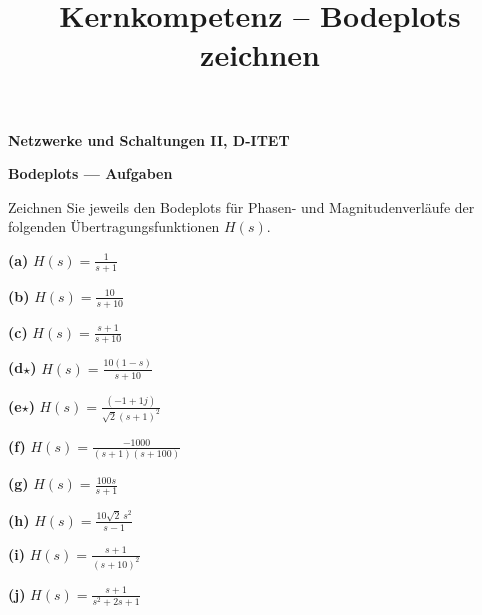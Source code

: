 \documentclass[a4paper,12pt]{article}
\title{Kernkompetenz – Bodeplots zeichnen}
\author{}
\date{}
\begin{document}
\begin{titlepage}
  \thispagestyle{firstpage}
  \vspace*{4cm}
  \begin{center}
    {\Large\bfseries Netzwerke und Schaltungen II, D-ITET\par}
    \vspace{3mm}
    {\Huge\bfseries Bodeplots — Aufgaben\par}
    \vspace{9mm}
  \end{center}
  \vfill
\end{titlepage}


\noindent
Zeichnen Sie jeweils den Bodeplots für Phasen- und Magnitudenverläufe der folgenden Übertragungsfunktionen \( H(s) \).\\[1em]

\newcommand{\aufgabe}[2]{%
  \parbox[t]{0.48\textwidth}{\textbf{(#1)} \quad \Large\( #2 \)}%
}


\aufgabe{a}{H(s) = \frac{1}{s + 1}}
\hfill
\aufgabe{b}{H(s) = \frac{10}{s + 10}}

\vspace{1.5em}

\aufgabe{c}{H(s) = \frac{s + 1}{s + 10}}
\hfill
\aufgabe{d\textbf{$\star$}}{H(s) = \frac{10(1-s)}{s + 10}}

\vspace{1.5em}

\aufgabe{e\textbf{$\star$}}{H(s) = \frac{(-1+1j)}{\sqrt{2}(s + 1)^2}}
\hfill
\aufgabe{f}{H(s) = \frac{-1000}{(s + 1)(s + 100)}}

\vspace{1.5em}

\aufgabe{g}{H(s) = \frac{100s}{s + 1}}
\hfill
\aufgabe{h}{H(s) = \frac{10\sqrt{2}\, s^2}{s - 1}}

\vspace{1.5em}

\aufgabe{i}{H(s) = \frac{s + 1}{(s + 10)^2}}
\hfill
\aufgabe{j}{H(s) = \frac{s + 1}{s^2 + 2s + 1}}

\vspace{1.5em}
\end{document}

